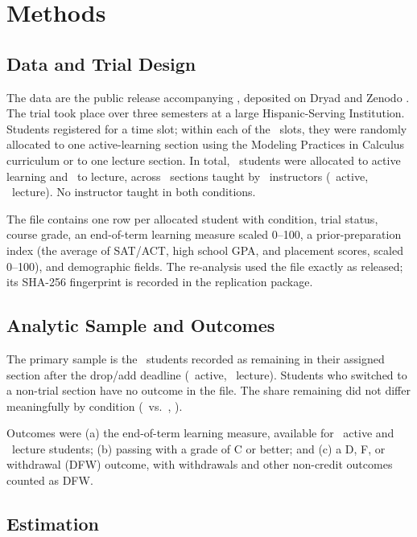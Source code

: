 \documentclass[10pt,twocolumn,letterpaper]{article}
\begin{document}
\section{Methods}

\subsection{Data and Trial Design}\label{sec:data}

The data are the public release accompanying \citet{kramer2023}, deposited on Dryad and Zenodo \citep{kramer2023data}. The trial took place over three semesters at a large Hispanic-Serving Institution. Students registered for a time slot; within each of the \Nslots\ slots, they were randomly allocated to one active-learning section using the Modeling Practices in Calculus curriculum or to one lecture section. In total, \Nact\ students were allocated to active learning and \Nlec\ to lecture, across \Nsections\ sections taught by \Ninstr\ instructors (\NinstrAct\ active, \NinstrLec\ lecture). No instructor taught in both conditions.

The file contains one row per allocated student with condition, trial status, course grade, an end-of-term learning measure scaled 0--100, a prior-preparation index (the average of SAT/ACT, high school GPA, and placement scores, scaled 0--100), and demographic fields. The re-analysis used the file exactly as released; its SHA-256 fingerprint is recorded in the replication package.

\subsection{Analytic Sample and Outcomes}

The primary sample is the \Nstay\ students recorded as remaining in their assigned section after the drop/add deadline (\NstayAct\ active, \NstayLec\ lecture). Students who switched to a non-trial section have no outcome in the file. The share remaining did not differ meaningfully by condition (\StayRateAct\ vs.\ \StayRateLec, \StayP).

Outcomes were (a) the end-of-term learning measure, available for \LMnAct\ active and \LMnLec\ lecture students; (b) passing with a grade of C or better; and (c) a D, F, or withdrawal (DFW) outcome, with withdrawals and other non-credit outcomes counted as DFW.

\subsection{Estimation}\label{sec:estimation}
\end{document}
